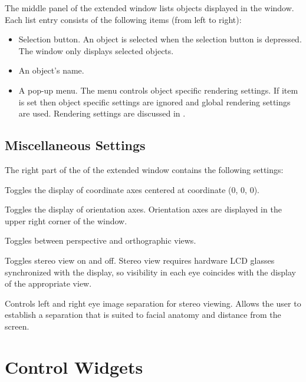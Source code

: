 The middle panel of the extended \viewer{} window lists objects
displayed in the \viewer{} window.  Each list entry consists of the
following items (from left to right):

\begin{itemize}
\item Selection button.  An object is selected when the selection
  button is depressed.  The \viewer{} window only displays selected
  objects.
\item An object's name.
\item A  pop-up menu.  The  menu
  controls object specific rendering settings.  If item  is set then object specific settings are ignored
  and global rendering settings are used.  Rendering settings
  are discussed in .
\end{itemize}


\subsection{Miscellaneous Settings}

The right part of the of the extended \viewer{} window contains the
following settings:

\begin{description}
 Toggles the display of coordinate axes centered at
coordinate (0, 0, 0).

 Toggles the display of orientation axes.
Orientation axes are displayed in the upper right corner of the
\viewer{} window.

 Toggles between perspective and orthographic views.

 Toggles stereo view on and off.  Stereo view
requires hardware LCD glasses synchronized with the display, so
visibility in each eye coincides with the display of the appropriate
view.

 Controls left and right eye image separation
for stereo viewing.  Allows the user to establish a separation that is
suited to facial anatomy and distance from the screen.

\end{description}


\section{Control Widgets}
\label{sec:view-widgets}


